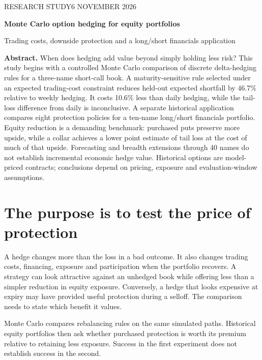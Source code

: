 \documentclass[11pt,a4paper]{article}
\begin{document}
\thispagestyle{plain}
{\small\sffamily\color{muted}RESEARCH STUDY\hfill 6 NOVEMBER 2026}\par
\vspace{10pt}
{\fontsize{25}{29}\selectfont\bfseries\color{ink}Monte Carlo option hedging for equity portfolios\par}
\vspace{8pt}{\normalsize Sai Reddivari}\par
{\small\color{muted}Trading costs, downside protection and a long/short financials application}\par
{}\vspace{8pt}

\textbf{Abstract.} When does hedging add value beyond simply holding less risk? This study begins with a controlled Monte Carlo comparison of discrete delta-hedging rules for a three-name short-call book. A maturity-sensitive rule selected under an expected trading-cost constraint reduces held-out expected shortfall by 46.7\% relative to weekly hedging. It costs 10.6\% less than daily hedging, while the tail-loss difference from daily is inconclusive. A separate historical application compares eight protection policies for a ten-name long/short financials portfolio. Equity reduction is a demanding benchmark: purchased puts preserve more upside, while a collar achieves a lower point estimate of tail loss at the cost of much of that upside. Forecasting and breadth extensions through 40 names do not establish incremental economic hedge value. Historical options are model-priced contracts; conclusions depend on pricing, exposure and evaluation-window assumptions.

\section*{The purpose is to test the price of protection}
A hedge changes more than the loss in a bad outcome. It also changes trading costs, financing, exposure and participation when the portfolio recovers. A strategy can look attractive against an unhedged book while offering less than a simpler reduction in equity exposure. Conversely, a hedge that looks expensive at expiry may have provided useful protection during a selloff. The comparison needs to state which benefit it values.

Monte Carlo compares rebalancing rules on the same simulated paths. Historical equity portfolios then ask whether purchased protection is worth its premium relative to retaining less exposure. Success in the first experiment does not establish success in the second.
\end{document}
